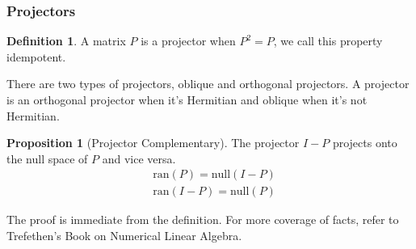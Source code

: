 \documentclass[]{article}
\theoremstyle{definition}
\newtheorem{prop}{Proposition}[section]  %
\newtheorem{definition}{Definition}      %
\begin{document}
        \subsubsection{Projectors}
            \begin{definition}
                A matrix $P$ is a projector when $P^2 = P$, we call this property idempotent. 
            \end{definition}
            There are two types of projectors, oblique and orthogonal projectors. A projector is an orthogonal projector when it's Hermitian and oblique when it's not Hermitian. 
            \begin{prop}[Projector Complementary]
                The projector $I - P$ projects onto the null space of $P$ and vice versa. 
                \begin{align}
                    & \text{ran}(P) = \text{null}(I - P)
                    \\
                    & \text{ran}(I - P) = \text{null}(P)
                \end{align}
            \end{prop}
            The proof is immediate from the definition. For more coverage of facts, refer to Trefethen's Book on Numerical Linear Algebra\cite{book:trefethen}.
\end{document}

